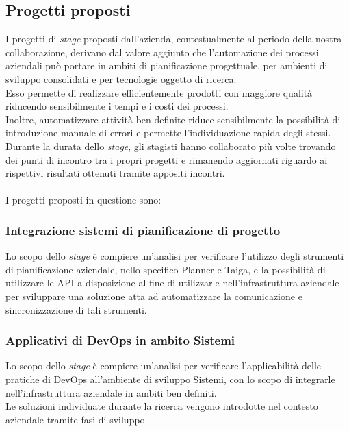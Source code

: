 \subsection{Progetti proposti}
I progetti di \emph{stage} proposti dall'azienda, contestualmente al periodo della nostra collaborazione, derivano dal valore aggiunto che l'automazione dei processi aziendali può portare in ambiti di pianificazione progettuale, per ambienti di sviluppo consolidati e per tecnologie oggetto di ricerca.\\
Esso permette di realizzare efficientemente prodotti con maggiore qualità riducendo sensibilmente i tempi e i costi dei processi.\\
Inoltre, automatizzare attività ben definite riduce sensibilmente la possibilità di introduzione manuale di errori e permette l'individuazione rapida degli stessi.\\
Durante la durata dello \emph{stage}, gli stagisti hanno collaborato più volte trovando dei punti di incontro tra i propri progetti e rimanendo aggiornati riguardo ai rispettivi risultati ottenuti tramite appositi incontri.\\\\
I progetti proposti in questione sono: 

\subsubsection*{Integrazione sistemi di pianificazione di progetto}
Lo scopo dello \emph{stage} è compiere un'analisi per verificare l'utilizzo degli strumenti di pianificazione aziendale, nello specifico Planner e Taiga, e la possibilità di utilizzare le \gls{API} a disposizione al fine di utilizzarle nell'infrastruttura aziendale per sviluppare una soluzione atta ad automatizzare la comunicazione e sincronizzazione di tali strumenti.

\subsubsection*{Applicativi di \gls{DevOps} in ambito Sistemi}
\label{stageDavide}
Lo scopo dello \emph{stage} è compiere un'analisi per verificare l'applicabilità delle pratiche di \gls{DevOps} all'ambiente di sviluppo \gls{Sistemi}, con lo scopo di integrarle nell'infrastruttura aziendale in ambiti ben definiti.\\
Le soluzioni individuate durante la ricerca vengono introdotte nel contesto aziendale tramite fasi di sviluppo. 
 

